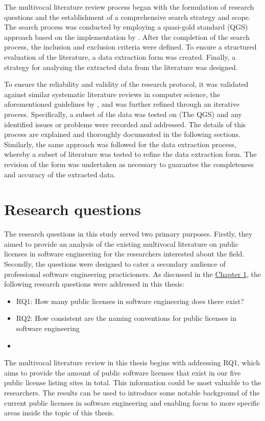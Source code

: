 The multivocal literature review process began with the formulation of research questions and the establishment of a comprehensive search strategy and scope. The search process was conducted by employing a quasi-gold standard (QGS) approach based on the implementation by \cite{qgs}. After the completion of the search process, the inclusion and exclusion criteria were defined. To ensure a structured evaluation of the literature, a data extraction form was created. Finally, a strategy for analyzing the extracted data from the literature was designed.

 To ensure the reliability and validity of the research protocol, it was validated against similar systematic literature reviews in computer science, the aforementioned guidelines by \cite{kitchenham2007}, and was further refined through an iterative process. Specifically, a subset of the data was tested on (The QGS) and any identified issues or problems were recorded and addressed. The details of this process are explained and thoroughly documented in the following sections. Similarly, the same approach was followed for the data extraction process, whereby a subset of literature was tested to refine the data extraction form. The revision of the form was undertaken as necessary to guarantee the completeness and accuracy of the extracted data.

\section{Research questions}\label{rqs}
The research questions in this study served two primary purposes. Firstly, they aimed to provide an analysis of the existing multivocal literature on public licenses in software engineering for the researchers interested about the field. Secondly, the questions were designed to cater a secondary audience of professional software engineering practicioners. As discussed in the \hyperref[intro]{Chapter 1}, the following research questions were addressed in this thesis:

\begin{itemize}
  \item RQ1: How many public licenses in software engineering does there exist?
  \item RQ2: How consistent are the naming conventions for public licenses in software engineering
  \item 
\end{itemize}

The multivocal literature review in this thesis begins with addressing RQ1, which aims to provide the amount of public software licenses that exist in our five public license listing sites in total. This information could be most valuable to the researchers. The results can be used to introduce some notable background of the current public licenses in software engineering and enabling focus to more specific areas inside the topic of this thesis.

